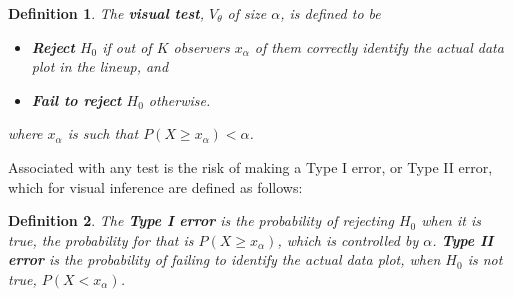 \documentclass{article}
\newcommand{\blue}[1]{{\color{blue} #1}} %
\newcommand{\red}[1]{{\color{red} #1}} %
\newtheorem{dfn}{Definition}[section]
\begin{document}



\begin{dfn}\label{dfn:test}
The \textbf{visual test}, $V_{\theta}$  of size $\alpha$, is defined to be 
\begin{itemize}\itemsep-3pt
\item \textbf{Reject} $H_0$ if out of $K$ observers $x_{\alpha}$ of them correctly identify the actual data plot in the lineup, and
\item \textbf{Fail to reject} $H_0$  otherwise. %
\end{itemize}
where $x_{\alpha}$ is such that $P(X \ge x_{\alpha}) < \alpha$. 
\end{dfn}

Associated with any test is the risk of making a Type I error, or Type II error, which for visual inference are defined as follows: 

\begin{dfn}\label{dfn:error}
The \textbf{Type I error} is the probability of rejecting $H_0$ when it is true, the probability for that is $P(X \ge x_{\alpha})$, which is controlled by $\alpha$.
\textbf{Type II error} is the probability of failing to identify the actual data plot, when $H_0$ is not true, $P( X <  x_{\alpha})$.
\end{dfn}
\end{document}
